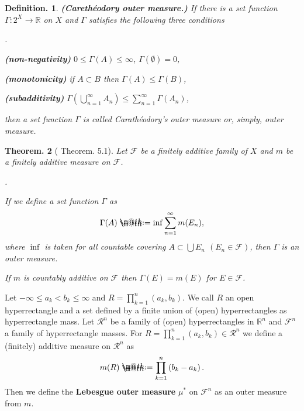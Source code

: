 \documentclass[openany, a4paper, oneside]{book}
\makeatletter
\newcounter{enum2}
\renewenvironment{enumerate}{%
\begin{list}%
{%
\arabic{enum2}.\ \,%
}%
{%
\usecounter{enum2}
\setlength{\itemindent}{0pt}%
\setlength{\leftmargin}{6pt}%
\setlength{\rightmargin}{0pt}%
\setlength{\labelsep}{0pt}%
\setlength{\labelwidth}{6pt}%
\setlength{\itemsep}{0pt}%
\setlength{\parsep}{0pt}%
\setlength{\listparindent}{0pt}%
}
}{%
\end{list}%
}
\newcommand*{\defeq}{\mathrel{\rlap{%
\raisebox{0.3ex}{$\m@th\cdot$}}%
\raisebox{-0.3ex}{$\m@th\cdot$}}%
=}
\theoremstyle{break}
\newtheorem{thm}{Theorem.}[section]
\theoremstyle{breakdefn}
\newtheorem{defn}[thm]{Definition.}
\newcommand{\rbk}[1]{\left (#1\right)}
\newcommand{\bbR}{\mathbb{R}}
\newcommand{\bbRn}{\mathbb{R}^n}
\newcommand{\calF}{\mathcal{F}}
\newcommand{\calR}{\mathcal{R}}
\newcommand{\upbf}[1]{\textup{\textbf{#1}}}
\makeatother
\begin{document}
\begin{defn}\upbf{(Careth\'eodory outer measure.)}
 If there is a set function $\Gamma \colon 2^X \to \bbR$ on $X$ and $\Gamma$ satisfies the following three conditions
\begin{enumerate}
\item \upbf{(non-negativity)} $0 \leq \Gamma (A) \leq \infty$, $\Gamma (\emptyset) = 0$,
\item \upbf{(monotonicity)} if $A \subset B$ then $\Gamma (A) \leq \Gamma (B)$,
\item \upbf{(subadditivity)} $\Gamma (\bigcup_{n=1}^{\infty} A_n) \leq \sum_{n=1}^{\infty} \Gamma (A_n)$,
\end{enumerate}
 then a set function $\Gamma$ is called Carath\'eodory's outer measure or, simply, outer measure.
\end{defn}
\begin{thm}[\cite{SeizoIto1} Theorem. 5.1]
 Let $\calF$ be a finitely additive family of $X$ and $m$ be a finitely additive measure on $\calF$.
\begin{enumerate}
\item If we define a set function $\Gamma$ as
    \begin{align}
     \Gamma (A)
     \defeq
     \inf \sum_{n=1}^{\infty} m (E_n),
    \end{align}
    where $\inf$ is taken for all countable covering $A \subset \bigcup E_n$ $(E_n \in \calF)$,
    then $\Gamma$ is an outer measure.
\item If $m$ is countably additive on $\calF$ then $\Gamma (E) = m (E)$ for $E \in \calF$.
\end{enumerate}
\end{thm}
Let $- \infty \leq a_k < b_k \leq \infty$ and $R = \prod_{k=1}^{n} \rbk{a_k, b_k}$.
We call $R$ an open hyperrectangle and a set defined by a finite union of (open) hyperrectangles as hyperrectangle mass.
Let $\calR^n$ be a family of (open) hyperrectangles in $\bbRn$ and $\calF^n$ a family of hyperrectangle masses.
For $R = \prod_{k=1}^{n} \rbk{a_k, b_k} \in \calR^n$ we define a (finitely) additive measure on $\calR^n$ as
\begin{align}
 m (R)
 \defeq
 \prod_{k=1}^n \rbk{b_k - a_k}.
\end{align}
Then we define the \upbf{Lebesgue outer measure} $\mu^*$ on $\calF^n$ as an outer measure from $m$.
\end{document}
